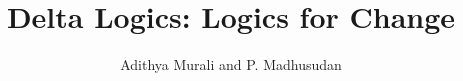 \documentclass{llncs}
\begin{document}
\newcommand{\HLS}{\textit{HLS}}
\newcommand{\sem}[1]{\llbracket #1 \rrbracket}
\pagestyle{plain} %

\title{Delta Logics: Logics for Change}
\author{Adithya Murali and P. Madhusudan
}


\maketitle

\begin{abstract}
~\\
\end{abstract}


%






\end{document}
